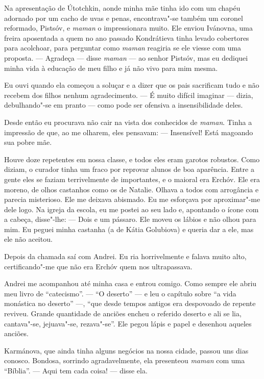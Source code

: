 Na apresentação de Útotchkin, aonde minha mãe tinha ido com um chapéu
adornado por um cacho de uvas e penas, encontrava"-se também um coronel
reformado, Pistsóv, e \emph{maman} o impressionara muito. Ele enviou
Ivánovna, uma freira aposentada a quem no ano passado Kondrátieva tinha
levado cobertores para acolchoar, para perguntar como \emph{maman}
reagiria se ele viesse com uma proposta. --- Agradeça --- disse
\emph{maman} --- ao senhor Pistsóv, mas eu dediquei minha vida à
educação de meu filho e já não vivo para mim mesma.

Eu ouvi quando ela começou a soluçar e a dizer que os pais sacrificam
tudo e não recebem dos filhos nenhum agradecimento. --- É muito difícil
imaginar --- dizia, debulhando"-se em pranto --- como pode ser ofensiva a
insensibilidade deles.

Desde então eu procurava não cair na vista dos conhecidos de
\emph{maman}. Tinha a impressão de que, ao me olharem, eles pensavam:
--- Insensível! Está magoando sua pobre mãe.

Houve doze repetentes em nossa classe, e todos eles eram garotos
robustos. Como diziam, o curador tinha um fraco por reprovar alunos de
boa aparência. Entre a gente eles se faziam terrivelmente de
importantes, e o maioral era Erchóv. Ele era moreno, de olhos castanhos
como os de Natalie. Olhava a todos com arrogância e parecia misterioso.
Ele me deixava abismado. Eu me esforçava por aproximar"-me dele logo. Na
igreja da escola, eu me postei ao seu lado e, apontando o ícone com a
cabeça, disse"-lhe: --- Dois e um pássaro. Ele moveu os lábios e não
olhou para mim. Eu peguei minha castanha (a de Kátia Golubiova) e queria
dar a ele, mas ele não aceitou.

Depois da chamada saí com Andrei. Eu ria horrivelmente e falava muito
alto, certificando"-me que não era Erchóv quem nos ultrapassava.

Andrei me acompanhou até minha casa e entrou comigo. Como sempre ele
abriu meu livro de ``catecismo''. --- ``O deserto'' --- e leu o capítulo
sobre ``a vida monástica no deserto'' ---, ``que desde tempos antigos
era despovoado de repente reviveu. Grande quantidade de anciões encheu o
referido deserto e ali se lia, cantava"-se, jejuava"-se, rezava"-se''. Ele
pegou lápis e papel e desenhou aqueles anciões.

Karmánova, que ainda tinha alguns negócios na nossa cidade, passou uns
dias conosco. Bondosa, sorrindo agradavelmente, ela presenteou
\emph{maman} com uma ``Bíblia''. --- Aqui tem cada coisa! --- disse ela. %


